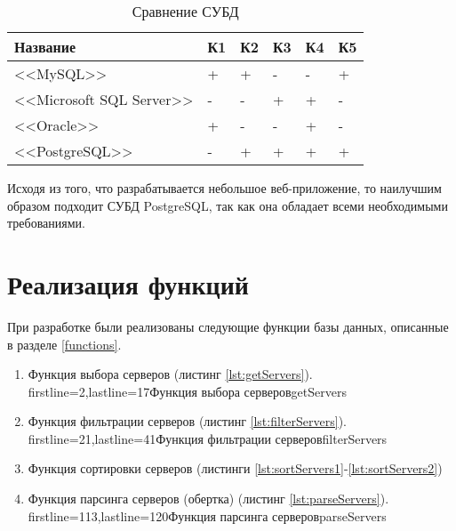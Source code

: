 \captionsetup{justification=raggedleft,singlelinecheck=off}
\begin{table}[H]
    \centering
	\caption{Сравнение СУБД}
    \label{tbl:compare_subd}
	\begin{tabular}{|l|l|l|l|l|l|}
        \hline
        \textbf{Название} & \textbf{К1} & \textbf{К2} & \textbf{К3} & \textbf{К4} & \textbf{К5} \\ \hline

        <<MySQL>>                   & + & + & - & - & + \\ \hline
        <<Microsoft SQL Server>>    & - & - & + & + & - \\ \hline
        <<Oracle>>                  & + & - & - & + & - \\ \hline
        <<PostgreSQL>>             & - & + & + & + & + \\ \hline

    \end{tabular}
\end{table}

Исходя из того, что разрабатывается небольшое веб-приложение, то наилучшим образом подходит СУБД PostgreSQL, так как она обладает всеми необходимыми требованиями.


\section{Реализация функций}

При разработке были реализованы следующие функции базы данных, описанные в разделе \ref{functions}.

\begin{enumerate}
    \item Функция выбора серверов (листинг \ref{lst:getServers}).
            {firstline=2,lastline=17}{Функция выбора серверов}{getServers}{}

    \item Функция фильтрации серверов (листинг \ref{lst:filterServers}).
            {firstline=21,lastline=41}{Функция фильтрации серверов}{filterServers}{}

    \item Функция сортировки серверов (листинги \ref{lst:sortServers1}-\ref{lst:sortServers2}) %

    \item Функция парсинга серверов (обертка) (листинг \ref{lst:parseServers}).
            {firstline=113,lastline=120}{Функция парсинга серверов}{parseServers}{}
\end{enumerate}



